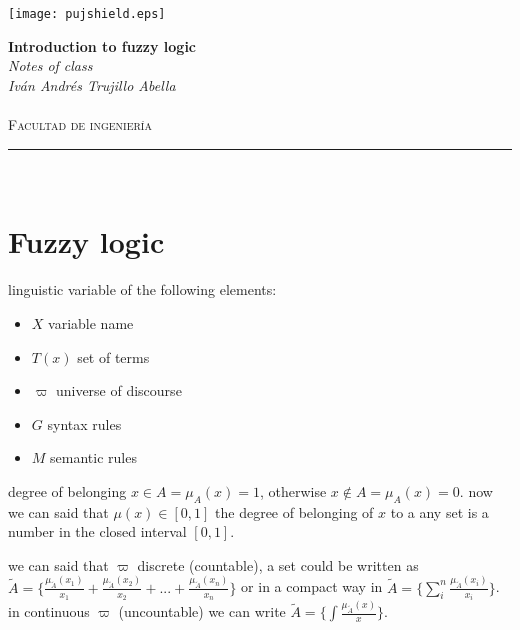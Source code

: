 \documentclass[10pt,a4paper]{article}
\author{Iván Andrés Trujillo }
\begin{document}
\newcommand{\HRule}{\rule{\linewidth}{0.5mm}}


\texttt{[image: pujshield.eps]}\\[0.5cm] 

\begin{center} 
\textbf{\LARGE Introduction to fuzzy logic}\\[0.2cm]
\emph{\LARGE Notes of class}\\[0.3cm] 
\emph{Iván Andrés Trujillo Abella} \\
\textsc{\Large 
}\\[0.2cm] 
\textsc{\large Facultad de ingeniería}\\[0.5cm] 
\HRule \\[0.4cm]
\end{center}
\vspace{1cm}


\section{Fuzzy logic}

linguistic variable of the following elements:

\begin{itemize}
\item $X$ variable name
\item $T(x)$ set of terms 
\item $\varpi$ universe of discourse
\item $G$ syntax rules
\item $M$ semantic rules
\end{itemize}

degree of belonging $x \in A  = \mu_{A}(x) = 1$, otherwise $ x \notin A = \mu_{A}(x) = 0$.
now we can said that $\mu(x) \in [0,1]$ the degree of belonging of $x$ to a any set is a number in the closed interval $[0,1]$.


we can said that $\varpi$ discrete (countable), a set could be written as   $\tilde{A} = \{ \frac{\mu_{\tilde{A}}(x_{1})}{x_{1}} + \frac{ \mu_{\tilde{A}}(x_{2})}{x_{2}}+...+ \frac{\mu_{\tilde{A}}(x_{n})}{x_{n}}   \}$ or in a compact way in $\tilde{A} = \{ \sum_{i}^{n}\frac{\mu_{\tilde{A}}(x_{i})}{x_{i}} \}$.
in continuous $\varpi$ (uncountable) we can write $\tilde{A} = \{ \int \frac{\mu_{\tilde{A}}(x)}{x} \}$.
\end{document}
